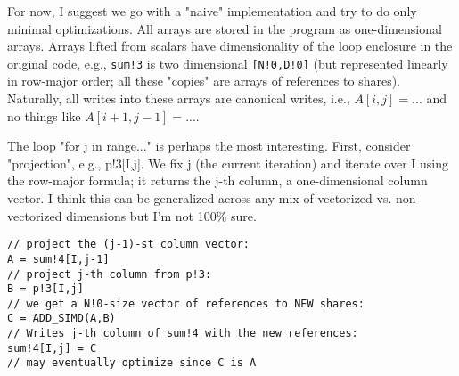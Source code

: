


For now, I suggest we go with a "naive" implementation and try to do only minimal optimizations. 
All arrays are stored in the program as one-dimensional arrays. Arrays lifted from scalars have dimensionality of the loop enclosure in 
the original code, e.g., \texttt{sum!3} is two dimensional \texttt{[N!0,D!0]} (but represented linearly in row-major order; all these "copies" are 
arrays of references to shares). Naturally, all writes into these arrays are canonical writes, i.e., $A[i,j] = ...$ and no things like $A[i+1,j-1] = ...$.

The loop "for j in range..." is perhaps the most interesting. First, consider "projection", e.g., p!3[I,j]. 
We fix j (the current iteration) and iterate over I using the row-major formula; it returns the j-th column, 
a one-dimensional column vector. I think this can be generalized across any mix of vectorized vs. 
non-vectorized dimensions but I'm not 100\% sure.

\begin{verbatim}
// project the (j-1)-st column vector:
A = sum!4[I,j-1]
// project j-th column from p!3: 
B = p!3[I,j] 
// we get a N!0-size vector of references to NEW shares:
C = ADD_SIMD(A,B) 
// Writes j-th column of sum!4 with the new references:
sum!4[I,j] = C 
// may eventually optimize since C is A
\end{verbatim}

